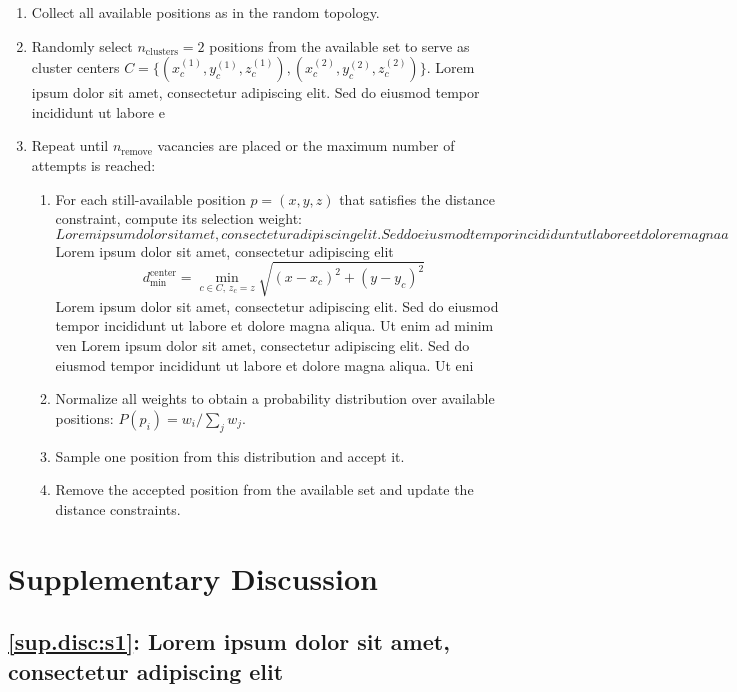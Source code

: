 \documentclass{article}
\begin{document}
\begin{enumerate}[label=\textbf{Step \arabic*.},leftmargin=*,itemsep=4pt]
\item Collect all available positions as in the random topology.

\item Randomly select $n_{\mathrm{clusters}} = 2$ positions from the available set to serve as cluster centers $C = \{(x_c^{(1)}, y_c^{(1)}, z_c^{(1)}), (x_c^{(2)}, y_c^{(2)}, z_c^{(2)})\}$.
Lorem ipsum dolor sit amet, consectetur adipiscing elit. Sed do eiusmod tempor incididunt ut labore e

\item Repeat until $n_{\mathrm{remove}}$ vacancies are placed or the maximum number of attempts is reached:
\begin{enumerate}[label=(\alph*),noitemsep]
\item For each still-available position $p = (x, y, z)$ that satisfies the distance constraint, compute its selection weight:
\begin{equation}
Lorem ipsum dolor sit amet, consectetur adipiscing elit. Sed do eiusmod tempor incididunt ut labore et dolore magna a
\end{equation}
Lorem ipsum dolor sit amet, consectetur adipiscing elit
\[d_{\min}^{\mathrm{center}} = \min_{c \in C,\, z_c = z} \sqrt{(x - x_c)^2 + (y - y_c)^2}\]
Lorem ipsum dolor sit amet, consectetur adipiscing elit. Sed do eiusmod tempor incididunt ut labore et dolore magna aliqua. Ut enim ad minim ven
Lorem ipsum dolor sit amet, consectetur adipiscing elit. Sed do eiusmod tempor incididunt ut labore et dolore magna aliqua. Ut eni

\item Normalize all weights to obtain a probability distribution over available positions: $P(p_i) = w_i / \sum_j w_j$.
\item Sample one position from this distribution and accept it.
\item Remove the accepted position from the available set and update the distance constraints.
\end{enumerate}
\end{enumerate}

\section{Supplementary Discussion}
\setcounter{subsection}{0}

\subsection*{\ref{sup.disc:s1}: Lorem ipsum dolor sit amet, consectetur adipiscing elit}
\label{sup.disc:s1}
\end{document}
